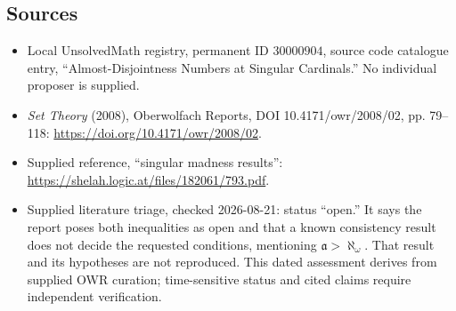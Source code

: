 \documentclass[11pt]{article}
\begin{document}
\subsection{Sources}
\begin{itemize}
\item Local UnsolvedMath registry, permanent ID \(30000904\), source code catalogue entry, ``Almost-Disjointness Numbers at Singular Cardinals.'' No individual proposer is supplied.
\item \emph{Set Theory} (2008), Oberwolfach Reports, DOI 10.4171/owr/2008/02, pp. 79--118: \url{https://doi.org/10.4171/owr/2008/02}.
\item Supplied reference, ``singular madness results'': \url{https://shelah.logic.at/files/182061/793.pdf}.
\item Supplied literature triage, checked 2026-08-21: status ``open.'' It says the report poses both inequalities as open and that a known consistency result does not decide the requested conditions, mentioning \(\mathfrak a>\aleph_\omega\). That result and its hypotheses are not reproduced. This dated assessment derives from supplied OWR curation; time-sensitive status and cited claims require independent verification.
\end{itemize}
\end{document}
